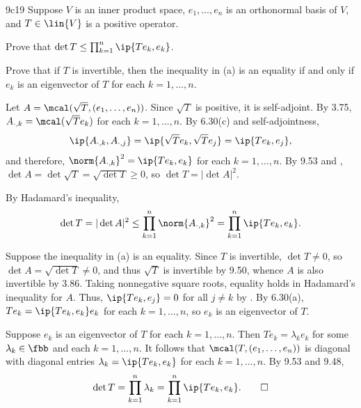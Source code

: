 \begin{exercise}{9c19}
    Suppose $V$ is an inner product space, $e_1, \ldots, e_n$ is an orthonormal basis of $V$, and $T \in \lin{V}$ is a positive operator.
    \begin{subexercises}
        \item Prove that $\det T \leq \prod_{k=1}^{n} \ip{Te_k, e_k}$.
        \item Prove that if $T$ is invertible, then the inequality in (a) is an equality if and only if $e_k$ is an eigenvector of $T$ for each $k = 1, \ldots, n$.
    \end{subexercises}
\end{exercise}

\begin{sol}
    Let $A = \mcal(\sqrt{T}, (e_1, \ldots, e_n))$.
    Since $\sqrt{T}$ is positive, it is self-adjoint.
    By 3.75, $A_{\cdot, k} = \mcal(\sqrt{T} e_k)$ for each $k = 1, \ldots, n$.
    By 6.30(c) and self-adjointness,
    \[
        \ip{A_{\cdot, k}, A_{\cdot, j}} = \ip{\sqrt{T} e_k, \sqrt{T} e_j} = \ip{T e_k, e_j},
    \]
    and therefore, $\norm{A_{\cdot, k}}^2 = \ip{T e_k, e_k}$ for each $k = 1, \ldots, n$.
    By 9.53 and , $\det A = \det \sqrt{T} = \sqrt{\det T} \geq 0$, so $\det T = |\det A|^2$.
    \begin{subexercises}
        \item By Hadamard's inequality,
        \[
            \det T = |\det A|^2 \leq \prod_{k=1}^n \norm{A_{\cdot, k}}^2 = \prod_{k=1}^n \ip{T e_k, e_k}.
        \]
        \item \rightimp Suppose the inequality in (a) is an equality.
        Since $T$ is invertible, $\det T \neq 0$, so $\det A = \sqrt{\det T} \neq 0$, and thus $\sqrt{T}$ is invertible by 9.50, whence $A$ is also invertible by 3.86.
        Taking nonnegative square roots, equality holds in Hadamard's inequality for $A$.
        Thus, $\ip{T e_k, e_j} = 0$ for all $j \neq k$ by .
        By 6.30(a), $T e_k = \ip{T e_k, e_k} e_k$ for each $k = 1, \ldots, n$, so $e_k$ is an eigenvector of $T$.

        \leftimp Suppose $e_k$ is an eigenvector of $T$ for each $k = 1, \ldots, n$.
        Then $T e_k = \lambda_k e_k$ for some $\lambda_k \in \fbb$ and each $k = 1, \ldots, n$.
        It follows that $\mcal(T, (e_1, \ldots, e_n))$ is diagonal with diagonal entries $\lambda_k = \ip{T e_k, e_k}$ for each $k = 1, \ldots, n$.
        By 9.53 and 9.48,
        \[
            \det T = \prod_{k=1}^n \lambda_k = \prod_{k=1}^n \ip{T e_k, e_k}. \qedhere
        \]
    \end{subexercises}
\end{sol}

